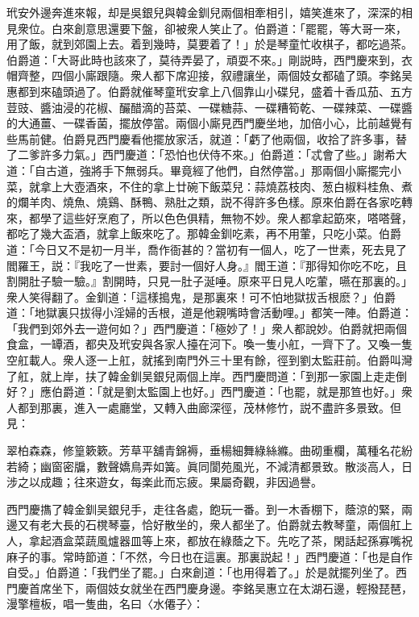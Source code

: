 玳安外邊奔進來報，却是吳銀兒與韓金釧兒兩個相牽相引，嬉笑進來了，深深的相見衆位。白來創意思還要下盤，卻被衆人笑止了。伯爵道：「罷罷，等大哥一來，用了飯，就到郊園上去。着到幾時，莫要着了！」於是琴童忙收棋子，都吃過茶。伯爵道：「大哥此時也該來了，莫待弄晏了，頑耍不來。」剛説時，西門慶來到，衣帽齊整，四個小廝跟隨。衆人都下席迎接，叙禮讓坐，兩個妓女都磕了頭。李銘吴惠都到來磕頭過了。伯爵就催琴童玳安拿上八個靠山小碟兒，盛着十香瓜茄、五方荳豉、醬油浸的花椒、釅醋滴的苔菜、一碟糖蒜、一碟糟筍乾、一碟辣菜、一碟醬的大通薑、一碟香菌，擺放停當。兩個小廝見西門慶坐地，加倍小心，比前越覺有些馬前健。伯爵見西門慶看他擺放家活，就道：「虧了他兩個，收拾了許多事，替了二爹許多力氣。」西門慶道：「恐怕也伏侍不來。」伯爵道：「忒會了些。」謝希大道：「自古道，強將手下無弱兵。畢竟經了他們，自然停當。」那兩個小廝擺完小菜，就拿上大壺酒來，不住的拿上廿碗下飯菜兒：蒜燒荔枝肉、葱白椒料桂魚、煮的爛羊肉、燒魚、燒鷄、酥鴨、熟肚之類，説不得許多色樣。原來伯爵在各家吃轉來，都學了這些好烹庖了，所以色色俱精，無物不妙。衆人都拿起筯來，嗒嗒聲，都吃了幾大盃酒，就拿上飯來吃了。那韓金釧吃素，再不用葷，只吃小菜。伯爵道：「今日又不是初一月半，喬作衙甚的？當初有一個人，吃了一世素，死去見了閻羅王，説：『我吃了一世素，要討一個好人身。』閻王道：『那得知你吃不吃，且割開肚子驗一驗。』割開時，只見一肚子涎唾。原來平日見人吃葷，嚥在那裏的。」衆人笑得翻了。金釧道：「這樣搗鬼，是那裏來！可不怕地獄拔舌根麽？」伯爵道：「地獄裏只拔得小淫婦的舌根，道是他親嘴時會活動哩。」都笑一陣。伯爵道：「我們到郊外去一遊何如？」西門慶道：「極妙了！」衆人都說妙。伯爵就把兩個食盒，一罈酒，都央及玳安與各家人擡在河下。喚一隻小舡，一齊下了。又喚一隻空舡載人。衆人逐一上舡，就搖到南門外三十里有餘，徑到劉太監莊前。伯爵叫灣了舡，就上岸，扶了韓金釧吴銀兒兩個上岸。西門慶問道：「到那一家園上走走倒好？」應伯爵道：「就是劉太監園上也好。」西門慶道：「也罷，就是那笪也好。」衆人都到那裏，進入一處廳堂，又轉入曲廊深徑，茂林修竹，説不盡許多景致。但見：

翠柏森森，修篁簌簌。芳草平舖青錦褥，垂楊細舞綠絲縧。曲砌重欄，萬種名花紛若綺；幽窗密牖，數聲嬌鳥弄如簧。眞同閬苑風光，不減清都景致。散淡高人，日涉之以成趣；往來遊女，每楽此而忘疲。果屬奇觀，非因過譽。

西門慶㩦了韓金釧吴銀兒手，走往各處，飽玩一番。到一木香棚下，蔭涼的緊，兩邊又有老大長的石櫈琴臺，恰好散坐的，衆人都坐了。伯爵就去教琴童，兩個舡上人，拿起酒盒菜蔬風爐器皿等上來，都放在綠蔭之下。先吃了茶，閑話起孫寡嘴祝麻子的事。常時節道：「不然，今日也在這裏。那裏説起！」西門慶道：「也是自作自受。」伯爵道：「我們坐了罷。」白來創道：「也用得着了。」於是就擺列坐了。西門慶首席坐下，兩個妓女就坐在西門慶身邊。李銘吴惠立在太湖石邊，輕撥琵琶，漫擎檀板，唱一隻曲，名曰〈水僊子〉：

